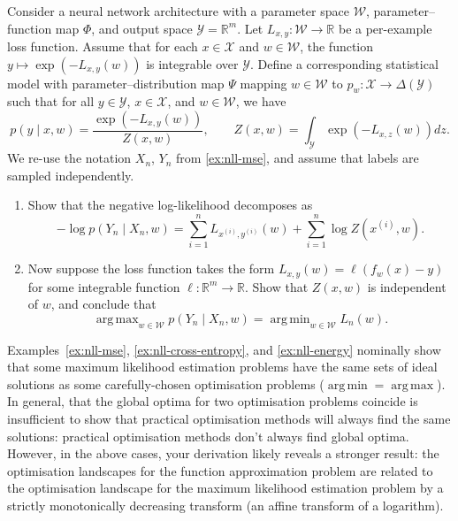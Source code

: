\documentclass[11pt]{article}
\newcommand{\R}{\mathbb{R}}
\DeclareMathOperator*{\argmin}{arg\,min}
\DeclareMathOperator*{\argmax}{arg\,max}
\newcommand{\X}{\mathcal{X}}
\newcommand{\Y}{\mathcal{Y}}
\newcommand{\W}{\mathcal{W}}
\begin{document}
\begin{exercise}
    \label{ex:nll-energy}
    Consider a neural network architecture with a parameter space $\W$,
    parameter--function map $\Phi$, and output space $\Y = \R^m$.
    Let $L_{x,y} : \W \to \R$ be a per-example loss function. Assume that for
    each $x \in \X$ and $w \in \W$, the function $y \mapsto \exp(-L_{x,y}(w))$
    is integrable over $\Y$. Define a corresponding statistical model with
    parameter--distribution map $\Psi$ mapping $w \in \W$ to
    $p_w : \X \to \Delta(\Y)$ such that for all $y \in \Y$, $x \in \X$, and
    $w \in \W$, we have
    $$
        p(y \mid x, w)
        =
        \frac
            {\exp\!\left(- L_{x,y}(w)\right)}
            {Z(x,w)}
        ,
        \qquad
        Z(x,w)
        =
        \int_{\Y}\exp\!\left(- L_{x,z}(w) \right)dz
        .
    $$
    We re-use the notation $X_n$, $Y_n$ from \cref{ex:nll-mse}, and assume
    that labels are sampled independently.
\begin{enumerate}
    \item
        Show that the negative log-likelihood decomposes as
        $$
            -\log p(Y_n \mid X_n, w)
            =
            \sum_{i=1}^n L_{x^{(i)},y^{(i)}}(w)
            +
            \sum_{i=1}^n \log Z(x^{(i)}, w)
        .$$
    \item
        Now suppose the loss function takes the form
            $L_{x,y}(w) = \ell(f_w(x) - y)$
        for some integrable function $\ell : \R^m \to \R$.
        Show that $Z(x, w)$ is independent of $w$, and conclude that
        $$
            \argmax_{w \in \W} p(Y_n \mid X_n, w)
            =
            \argmin_{w \in \W} L_n(w)
        .$$
\end{enumerate}
\end{exercise}
\begin{remark}
    Examples~\ref{ex:nll-mse}, \ref{ex:nll-cross-entropy}, and
    \ref{ex:nll-energy} nominally show that some maximum likelihood estimation
    problems have the same sets of ideal solutions as some carefully-chosen
    optimisation problems ($\argmin = \argmax$).
    In general, that the global optima for two optimisation problems coincide
    is insufficient to show that practical optimisation methods will always
    find the same solutions: practical optimisation methods don't always find
    global optima.
    However, in the above cases, your derivation likely reveals a stronger
    result: the optimisation landscapes for the function approximation
    problem are related to the optimisation landscape for the maximum
    likelihood estimation problem by a strictly monotonically decreasing
    transform (an affine transform of a logarithm).
\end{remark}
        
\end{document}
